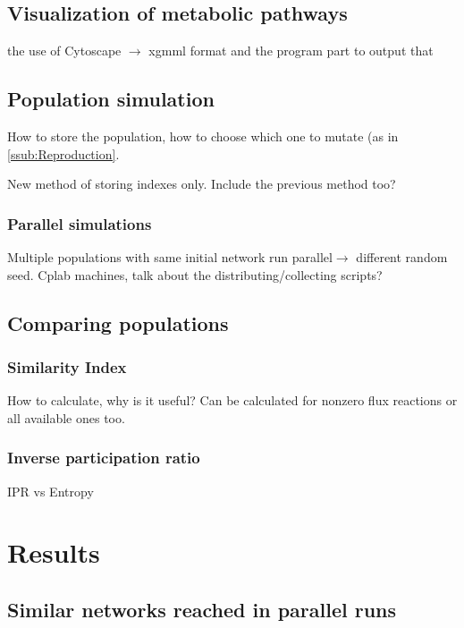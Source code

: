 \documentclass[10pt,a4paper]{article}
\begin{document}
\subsection{Visualization of metabolic pathways}
\label{sub:visualization}

the use of Cytoscape $\rightarrow$ xgmml format and the  program part to output that

\subsection{Population simulation}
\label{sub:population_simulation}
How to store the population, how to choose which one to mutate (as in \ref{ssub:Reproduction}. 

New method of storing indexes only. Include the previous method too?

\subsubsection{Parallel simulations}
\label{ssub:Paralell simulations}
Multiple populations with same initial network  run parallel$\rightarrow$ different random seed. Cplab machines, talk about the distributing/collecting scripts?


\subsection{Comparing populations}
\label{sub:comparing_populations}


\subsubsection{Similarity Index}
\label{ssub:Similarity Index}

How to calculate, why is it useful? Can be calculated for nonzero flux reactions or all available ones too. 

\subsubsection{Inverse participation ratio}
\label{ssub:Inverse participation ratio}
IPR vs Entropy


\section{Results}
\label{sec:results}

\subsection{Similar networks reached in parallel runs}
\label{sub:similar_networks_reached_in_paralell_runs}
\end{document}
